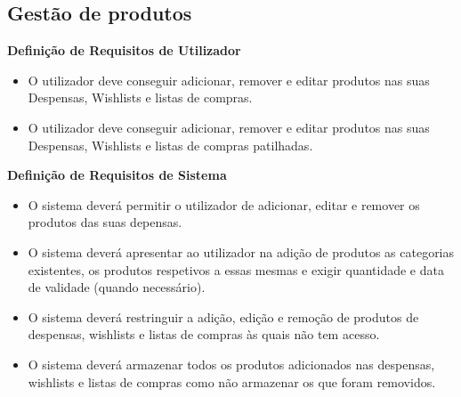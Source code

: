 \documentclass[a4paper]{report}
\begin{document}
        \subsection{Gestão de produtos}
            \textbf{Definição de Requisitos de Utilizador}
            \begin{itemize}
                \item O utilizador deve conseguir adicionar, remover e editar 
                produtos nas suas Despensas, Wishlists e listas de compras.
                \item O utilizador deve conseguir adicionar, remover e editar 
                produtos nas suas Despensas, Wishlists e listas de compras
                patilhadas.
            \end{itemize}
            \textbf{Definição de Requisitos de Sistema}
            \begin{itemize}
                \item O sistema deverá permitir o utilizador de adicionar, 
                editar e remover os produtos das suas depensas.
                \item O sistema deverá apresentar ao utilizador na adição de
                produtos as categorias existentes, os produtos respetivos a
                essas mesmas e exigir quantidade e data de validade 
                (quando necessário).
                \item O sistema deverá restringuir a adição, edição e remoção
                de produtos de despensas, wishlists e listas de compras
                às quais não tem acesso.
                \item O sistema deverá armazenar todos os produtos adicionados
                nas despensas, wishlists e listas de compras como não armazenar
                os que foram removidos.
            \end{itemize}
\end{document}
